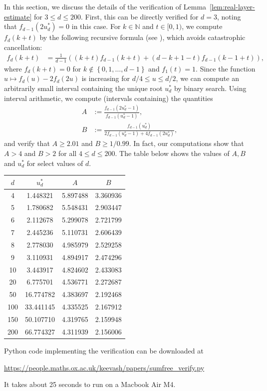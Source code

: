 \documentclass{article}
\newcommand{\paren}[1]{\left( #1 \right)}
\newcommand{\set}[1]{\left\{ #1 \right\}}
\newcommand{\NN}{\mathbb{N}}
\theoremstyle{definition}
\begin{document}
In this section, we discuss the details of the verification of Lemma~\ref{lem:real-layer-estimate} for $3\leq d\leq 200$. First, this can be directly verified for $d=3$, noting that $f_{d-1}(2u_d^*)=0$ in this case. For $k\in \NN$ and $t\in [0,1)$, we compute $f_d(k+t)$ by the following recursive formula (see \cite{J13}), which avoids catastrophic cancellation:
\begin{align*}
    f_d(k+t) &= \frac{1}{d-1}\paren{(k+t)f_{d-1}(k+t) + (d-k+1-t)f_{d-1}(k-1+t)},
\end{align*}
where $f_d(k+t)=0$ for $k\not\in \set{0,1,\ldots,d-1}$ and $f_1(t)=1$. Since the function $u\mapsto f_d(u)-2f_d(2u)$ is increasing for $d/4\leq u\leq d/2$, we can compute an arbitrarily small interval containing the unique root $u_d^*$ by binary search. Using interval arithmetic, we compute (intervals containing) the quantities
\begin{align*}
    A &:= \frac{f_{d-1}(2u_d^*-1)}{f_{d-1}(u_d^*-1)}, \\
    B &:= \frac{f_{d-1}(u_d^*)}{2f_{d-1}(u_d^*-1)+4f_{d-1}(2u_d^*)},
\end{align*}
and verify that $A\geq 2.01$ and $B\geq 1/0.99$. In fact, our computations show that $A>4$ and $B>2$ for all $4\leq d\leq 200$. The table below shows the values of $A,B$ and $u_d^*$ for select values of $d$.
\begin{center}
\begin{tabular}{c|c|c|c}
    $d$ & $u_d^*$ & $A$ & $B$ \\\hline
      4 & 1.448321 & 5.897488 & 3.360936\\
      5 & 1.780682 & 5.548431 & 2.903447\\
      6 & 2.112678 & 5.299078 & 2.721799\\
      7 & 2.445236 & 5.110731 & 2.606439\\
      8 & 2.778030 & 4.985979 & 2.529258\\
      9 & 3.110931 & 4.894917 & 2.474296\\
     10 & 3.443917 & 4.824602 & 2.433083\\
     20 & 6.775701 & 4.536771 & 2.272687\\
     50 & 16.774782 & 4.383697 & 2.192468\\
    100 & 33.441145 & 4.335525 & 2.167912\\
    150 & 50.107710 & 4.319765 & 2.159948\\
    200 & 66.774327 & 4.311939 & 2.156006
\end{tabular}
\end{center}

Python code implementing the verification can be downloaded at

\hspace{1cm} \url{https://people.maths.ox.ac.uk/keevash/papers/sumfree_verify.py}

It takes about 25 seconds to run on a Macbook Air M4.
\end{document}

